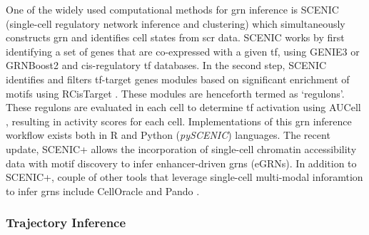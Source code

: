\par One of the widely used computational methods for \gls{grn} inference is SCENIC (single-cell regulatory network inference and clustering) \textbf{\cite{aibar_scenic_2017,van_de_sande_scalable_2020}} which simultaneously constructs \gls{grn} and identifies cell states from \gls{scr} data. SCENIC works by first identifying a set of genes that are co-expressed with a given \gls{tf}, using GENIE3 \textbf{\cite{huynh-thu_inferring_2010}} or GRNBoost2 \textbf{\cite{moerman_grnboost2_2019}} and cis-regulatory \gls{tf} databases. In the second step, SCENIC identifies and filters \gls{tf}-target genes modules based on significant enrichment of motifs using  RCisTarget \textbf{\cite{aibar_scenic_2017,noauthor_rcistarget_nodate}}. These modules are henceforth termed as `regulons'. These regulons are evaluated in each cell to determine \gls{tf} activation using AUCell \textbf{\cite{aibar_scenic_2017,noauthor_aucell_nodate}}, resulting in activity scores for each cell. Implementations of this \gls{grn} inference workflow exists both in R and Python (\textit{pySCENIC}) \textbf{\cite{kumar_inference_2021}} languages. The recent update, SCENIC+ \textbf{\cite{bravo_gonzalez-blas_scenic_2023}} allows the incorporation of single-cell chromatin accessibility data with motif discovery to infer enhancer-driven \glspl{grn} (eGRNs). In addition to SCENIC+, couple of other tools that leverage single-cell multi-modal inforamtion to infer \glspl{grn} include CellOracle \textbf{\cite{kamimoto_dissecting_2023}} and Pando \textbf{\cite{fleck_inferring_2023}}. 



\subsubsection{Trajectory Inference}
\label{sec:scrna_analysis_grn}


